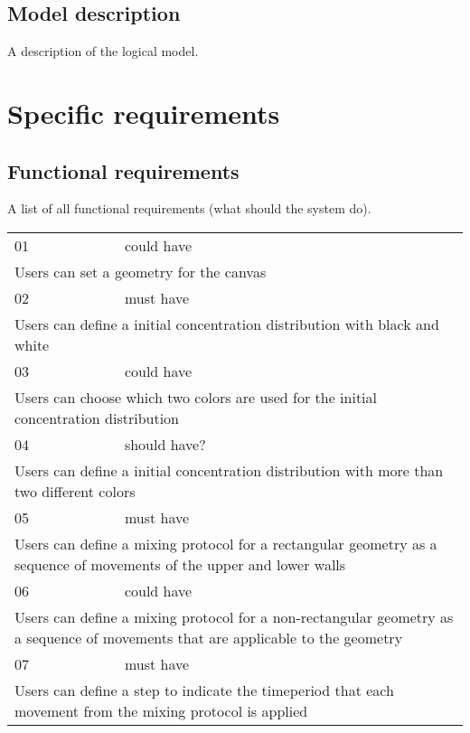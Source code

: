 \section{Model description}
A description of the logical model.

\chapter{Specific requirements}
\section{Functional requirements}
A list of all functional requirements (what should the system do).

\begin{center}
\begin{tabular}{ p{} p{}}

01 & could have \\
\multicolumn{2}{p{\textwidth}}{Users can set a geometry for the canvas} \\
\hline

02 & must have \\
\multicolumn{2}{p{\textwidth}}{Users can define a initial concentration distribution with black and white} \\
\hline

03 & could have \\
\multicolumn{2}{p{\textwidth}}{Users can choose which two colors are used for the initial concentration distribution} \\
\hline

04 & should have? \\
\multicolumn{2}{p{\textwidth}}{Users can define a initial concentration distribution with more than two different colors} \\
\hline

05 & must have \\
\multicolumn{2}{p{\textwidth}}{Users can define a mixing protocol for a rectangular geometry as a sequence of movements of the upper and lower walls}\\
\hline

06 & could have \\
\multicolumn{2}{p{\textwidth}}{Users can define a mixing protocol for a non-rectangular geometry as a sequence of movements that are applicable to the geometry}\\
\hline

07 & must have \\
\multicolumn{2}{p{\textwidth}}{Users can define a step to indicate the timeperiod that each movement from the mixing protocol is applied}\\
\hline


\end{tabular}
\end{center}
